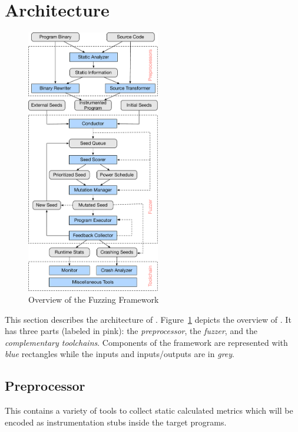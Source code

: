 \section{Architecture}\label{sec:details}

\begin{figure}[t]
	\centering
	\includegraphics[width=0.52\textwidth]{res/fot/FOT_overview}
	\caption{Overview of the {\FOT} Fuzzing Framework}
	\label{fig:fot_workflow}
\end{figure}

This section describes the architecture of {\FOT}.
Figure~\ref{fig:fot_workflow} depicts the overview of {\FOT}.
It has three parts (labeled in pink): the \emph{preprocessor}, the \emph{fuzzer}, and the \emph{complementary toolchains}.
Components of the framework are represented with \emph{blue} rectangles while the inputs and inputs/outputs are in \emph{grey}.


\subsection{Preprocessor}
This contains a variety of tools to collect static calculated metrics which will be encoded as instrumentation stubs inside the target programs.


